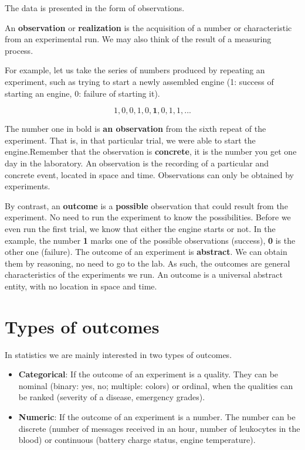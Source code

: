 \documentclass[
]{book}
\begin{document}
The data is presented in the form of observations.

An \textbf{observation} or \textbf{realization} is the acquisition of a number or characteristic from an experimental run. We may also think of the result of a measuring process.

For example, let us take the series of numbers produced by repeating an experiment, such as trying to start a newly assembled engine (1: success of starting an engine, 0: failure of starting it).

\[1, 0, 0, 1, 0, \mathbf{1}, 0, 1, 1, ...\]

The number one in bold is \textbf{an observation} from the sixth repeat of the experiment. That is, in that particular trial, we were able to start the engine.Remember that the observation is \textbf{concrete}, it is the number you get one day in the laboratory. An observation is the recording of a particular and concrete event, located in space and time. Observations can only be obtained by experiments.

By contrast, an \textbf{outcome} is a \textbf{possible} observation that could result from the experiment. No need to run the experiment to know the possibilities. Before we even run the first trial, we know that either the engine starts or not. In the example, the number \textbf{1} marks one of the possible observations (success), \textbf{0} is the other one (failure). The outcome of an experiment is \textbf{abstract}. We can obtain them by reasoning, no need to go to the lab. As such, the outcomes are general characteristics of the experiments we run. An outcome is a universal abstract entity, with no location in space and time.

\hypertarget{types-of-outcomes}{%
\section{Types of outcomes}\label{types-of-outcomes}}

In statistics we are mainly interested in two types of outcomes.

\begin{itemize}
\item
  \textbf{Categorical}: If the outcome of an experiment is a quality. They can be nominal (binary: yes, no; multiple: colors) or ordinal, when the qualities can be ranked (severity of a disease, emergency grades).
\item
  \textbf{Numeric}: If the outcome of an experiment is a number. The number can be discrete (number of messages received in an hour, number of leukocytes in the blood) or continuous (battery charge status, engine temperature).
\end{itemize}
\end{document}
